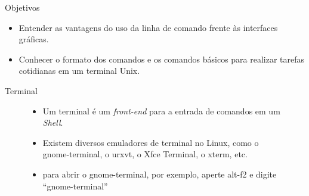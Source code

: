 \documentclass{beamer}
\begin{document}
\newcommand{\software}{\emph{software}\xspace}
\newcommand{\Software}{\emph{Software}\xspace}
\newcommand{\softwarelivre}{\Software Livre\xspace}
\newcommand{\opensource}{\emph{Open-Source}\xspace}
\newcommand{\Shell}{\emph{Shell}\xspace}

\gpsltitle{Aula 02:\\ \Shell}

\begin{frame}{Objetivos}
  \begin{itemize}
  \item Entender as vantagens do uso da linha de comando frente às interfaces
    gráficas.
  \item Conhecer o formato dos comandos e os comandos básicos para realizar
    tarefas cotidianas em um  terminal Unix.
  \end{itemize}
\end{frame}


\begin{frame}{Terminal}
  \begin{figure}[h]
    \centering
    \begin{itemize}
      \item Um terminal é um \emph{front-end} para a entrada de comandos em um
        \Shell.
      \item Existem diversos emuladores de terminal no Linux, como o
        gnome-terminal, o urxvt, o Xfce Terminal, o xterm, etc.
        \item para abrir o gnome-terminal, por exemplo, aperte alt-f2 e
          digite ``gnome-terminal''
          \vfill
          \begin{center}
          \begin{shell}
          \end{shell}
          \end{center}
      \end{itemize}
  \end{figure}
\end{frame}
\end{document}
